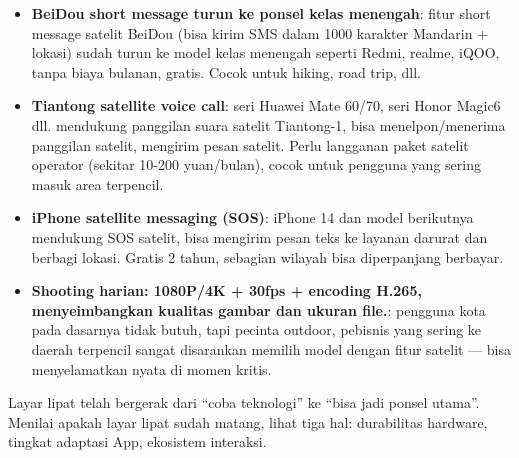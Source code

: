 \begin{itemize}
  \item \textbf{BeiDou short message turun ke ponsel kelas menengah}: fitur short message satelit BeiDou (bisa kirim SMS dalam 1000 karakter Mandarin + lokasi) sudah turun ke model kelas menengah seperti Redmi, realme, iQOO, tanpa biaya bulanan, gratis. Cocok untuk hiking, road trip, dll.
  \item \textbf{Tiantong satellite voice call}: seri Huawei Mate 60/70, seri Honor Magic6 dll. mendukung panggilan suara satelit Tiantong-1, bisa menelpon/menerima panggilan satelit, mengirim pesan satelit. Perlu langganan paket satelit operator (sekitar 10-200 yuan/bulan), cocok untuk pengguna yang sering masuk area terpencil.
  \item \textbf{iPhone satellite messaging (SOS)}: iPhone 14 dan model berikutnya mendukung SOS satelit, bisa mengirim pesan teks ke layanan darurat dan berbagi lokasi. Gratis 2 tahun, sebagian wilayah bisa diperpanjang berbayar.
  \item \textbf{Shooting harian: 1080P/4K + 30fps + encoding H.265, menyeimbangkan kualitas gambar dan ukuran file.}: pengguna kota pada dasarnya tidak butuh, tapi pecinta outdoor, pebisnis yang sering ke daerah terpencil sangat disarankan memilih model dengan fitur satelit — bisa menyelamatkan nyata di momen kritis.
\end{itemize}


Layar lipat telah bergerak dari “coba teknologi” ke “bisa jadi ponsel utama”. Menilai apakah layar lipat sudah matang, lihat tiga hal: durabilitas hardware, tingkat adaptasi App, ekosistem interaksi.

